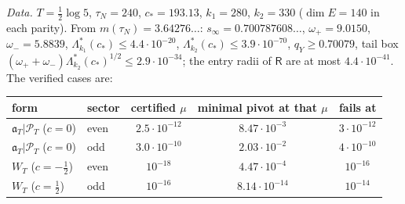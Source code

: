 \documentclass[11pt]{amsart}
\theoremstyle{definition}
\theoremstyle{remark}
\newcommand{\PT}{\mathcal P_T}
\begin{document}
\emph{Data.} $T=\frac12\log5$, $\tau_N=240$, $c_*=193.13$, $k_1=280$, $k_2=330$ ($\dim E=140$ in each parity).
From $m(\tau_N)=3.64276\ldots$: $s_\infty=0.700787608\ldots$, $\omega_+=9.0150$, $\omega_-=5.8839$,
$\Lambda^*_{k_1}(c_*)\le4.4\cdot10^{-20}$, $\Lambda^*_{k_2}(c_*)\le3.9\cdot10^{-70}$, $q_Y\ge0.70079$, tail
box $(\omega_++\omega_-)\Lambda^*_{k_2}(c_*)^{1/2}\le2.9\cdot10^{-34}$; the entry radii of $\mathsf R$ are at
most $4.4\cdot10^{-41}$. The verified cases are:
\begin{center}\small
\begin{tabular}{@{}llccc@{}}
\toprule
form & sector & certified $\mu$ & minimal pivot at that $\mu$ & fails at\\
\midrule
$\mathfrak a_T|\PT$ ($c=0$) & even & $2.5\cdot10^{-12}$ & $8.47\cdot10^{-3}$ & $3\cdot10^{-12}$\\
$\mathfrak a_T|\PT$ ($c=0$) & odd & $3.0\cdot10^{-10}$ & $2.03\cdot10^{-2}$ & $4\cdot10^{-10}$\\
$W_T$ ($c=-\frac12$) & even & $10^{-18}$ & $4.47\cdot10^{-4}$ & $10^{-16}$\\
$W_T$ ($c=\frac12$) & odd & $10^{-16}$ & $8.14\cdot10^{-14}$ & $10^{-14}$\\
\bottomrule
\end{tabular}
\end{center}
\end{document}
